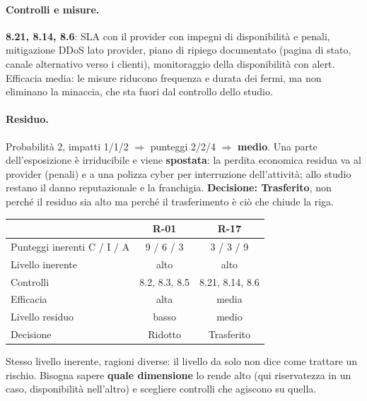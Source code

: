 \paragraph{Controlli e misure.} \textbf{8.21, 8.14, 8.6}: SLA con il provider con impegni di disponibilità
e penali, mitigazione DDoS lato provider, piano di ripiego documentato (pagina di stato, canale
alternativo verso i clienti), monitoraggio della disponibilità con alert. Efficacia media: le misure
riducono frequenza e durata dei fermi, ma non eliminano la minaccia, che sta fuori dal controllo dello
studio.

\paragraph{Residuo.} Probabilità 2, impatti 1/1/2 $\Rightarrow$ punteggi 2/2/4 $\Rightarrow$
\textbf{medio}. Una parte dell'esposizione è irriducibile e viene \textbf{spostata}: la perdita economica
residua va al provider (penali) e a una polizza cyber per interruzione dell'attività; allo studio restano
il danno reputazionale e la franchigia. \textbf{Decisione: Trasferito}, non perché il residuo sia alto ma
perché il trasferimento è ciò che chiude la riga.

\begin{center}
\small
\begin{tabular}{lcc}
\toprule
& \textbf{R-01} & \textbf{R-17} \\ \midrule
Punteggi inerenti C / I / A & 9 / 6 / 3 & 3 / 3 / 9 \\
Livello inerente & alto & alto \\
Controlli & 8.2, 8.3, 8.5 & 8.21, 8.14, 8.6 \\
Efficacia & alta & media \\
Livello residuo & basso & medio \\
Decisione & Ridotto & Trasferito \\ \bottomrule
\end{tabular}
\end{center}

\begin{esame}
Stesso livello inerente, ragioni diverse: il livello da solo non dice come trattare un rischio. Bisogna
sapere \textbf{quale dimensione} lo rende alto (qui riservatezza in un caso, disponibilità nell'altro) e
scegliere controlli che agiscono su quella.
\end{esame}

